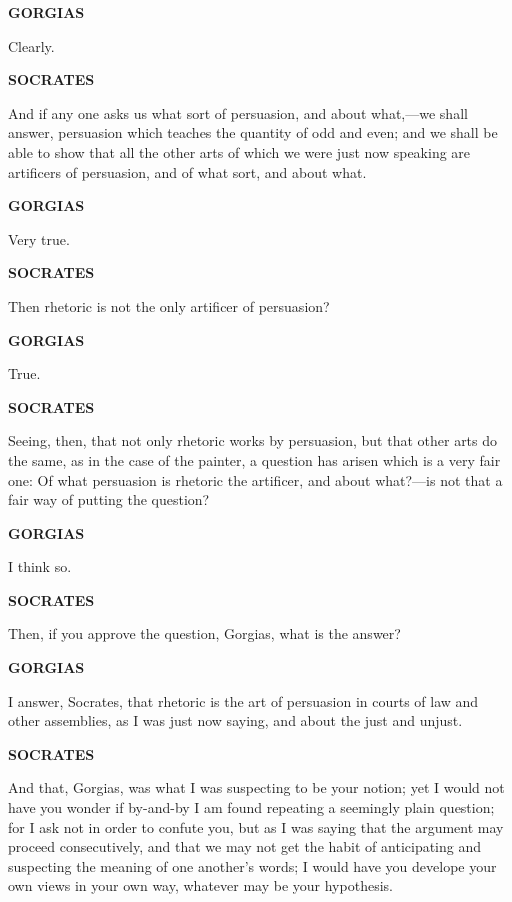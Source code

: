 \documentclass[11pt,letter]{article}
\begin{document}
\par \textbf{GORGIAS}
\par   Clearly.

\par \textbf{SOCRATES}
\par   And if any one asks us what sort of persuasion, and about what,—we shall answer, persuasion which teaches the quantity of odd and even; and we shall be able to show that all the other arts of which we were just now speaking are artificers of persuasion, and of what sort, and about what.

\par \textbf{GORGIAS}
\par   Very true.

\par \textbf{SOCRATES}
\par   Then rhetoric is not the only artificer of persuasion?

\par \textbf{GORGIAS}
\par   True.

\par \textbf{SOCRATES}
\par   Seeing, then, that not only rhetoric works by persuasion, but that other arts do the same, as in the case of the painter, a question has arisen which is a very fair one:  Of what persuasion is rhetoric the artificer, and about what?—is not that a fair way of putting the question?

\par \textbf{GORGIAS}
\par   I think so.

\par \textbf{SOCRATES}
\par   Then, if you approve the question, Gorgias, what is the answer?

\par \textbf{GORGIAS}
\par   I answer, Socrates, that rhetoric is the art of persuasion in courts of law and other assemblies, as I was just now saying, and about the just and unjust.

\par \textbf{SOCRATES}
\par   And that, Gorgias, was what I was suspecting to be your notion; yet I would not have you wonder if by-and-by I am found repeating a seemingly plain question; for I ask not in order to confute you, but as I was saying that the argument may proceed consecutively, and that we may not get the habit of anticipating and suspecting the meaning of one another’s words; I would have you develope your own views in your own way, whatever may be your hypothesis.
\end{document}
